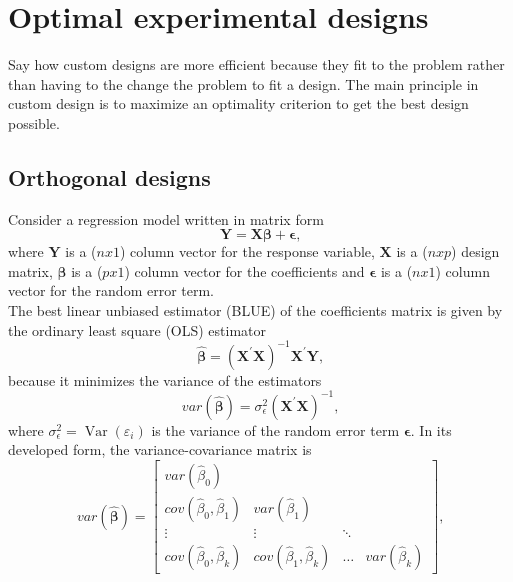 
\section{Optimal experimental designs}
\begin{formal}
Say how custom designs are more efficient because they fit to the problem rather than having to the change the problem to fit a design.
The main principle in custom design is to maximize an optimality criterion to get the best design possible.
\end{formal}


\subsection{Orthogonal designs}
Consider a regression model written in matrix form  
\begin{equation}
    \mathbf{Y} = \bm{X\beta} + \bm{\epsilon} \text{,}
\end{equation} 
where $\mathbf{Y}$ is a ($nx1$) column vector for the response variable, $\mathbf{X}$ is a ($nxp$) design matrix, $\bm{\beta}$ is a ($px1$) column vector for the coefficients and $\bm{\epsilon}$ is a ($nx1$) column vector for the random error term.\\
The best linear unbiased estimator (BLUE) of the coefficients matrix is given by the ordinary least square (OLS) estimator
\begin{equation}
    \hat{\bm{\beta}} = (\mathbf{X}^{\prime} \mathbf{X})^{-1}\mathbf{X}^{\prime} \mathbf{Y} \text{,}
\end{equation} 
because it minimizes the variance of the estimators
\begin{equation} \label{eq:var_coef_mat_unexpanded}
    var(\hat{\bm{\beta}}) = \sigma_{\epsilon}^2(\mathbf{X}^{\prime}
\mathbf{X})^{-1} \text{,}
\end{equation}
where $\sigma_{\epsilon}^2 = \operatorname{Var}\left(\varepsilon_{i}\right)$ is the variance of the random error term $\mathbf{\epsilon}$. 
In its developed form, the variance-covariance matrix is
\begin{equation}
    var(\hat{\bm{\beta}}) =
\begin{bmatrix}
var(\hat{\beta}_0) &  &  &  \\ 
cov(\hat{\beta}_0,\hat{\beta}_1) & var(\hat{\beta}_1) &  &  \\ 
\vdots & \vdots & \ddots & \\ 
cov(\hat{\beta}_0,\hat{\beta}_k) & cov(\hat{\beta}_1,\hat{\beta}_k) & \dots & var(\hat{\beta}_k)
\end{bmatrix} 
\text{,}
\label{eq:var_cov_mat}
\end{equation}
